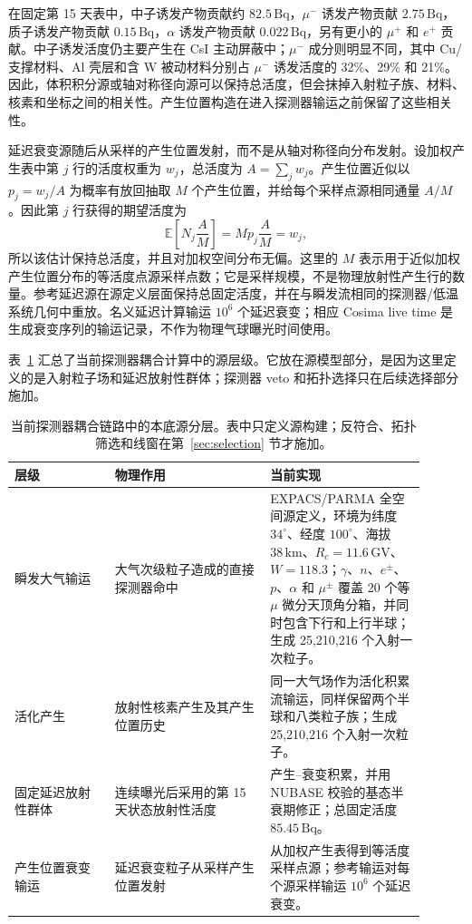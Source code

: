 \documentclass[preprint,12pt]{elsarticle}
\begin{document}
在固定第 15 天表中，中子诱发产物贡献约 $82.5\,\mathrm{Bq}$，$\mu^-$ 诱发产物贡献 $2.75\,\mathrm{Bq}$，质子诱发产物贡献 $0.15\,\mathrm{Bq}$，$\alpha$ 诱发产物贡献 $0.022\,\mathrm{Bq}$，另有更小的 $\mu^+$ 和 $e^+$ 贡献。中子诱发活度仍主要产生在 CsI 主动屏蔽中；$\mu^-$ 成分则明显不同，其中 Cu/支撑材料、Al 壳层和含 W 被动材料分别占 $\mu^-$ 诱发活度的 32\%、29\% 和 21\%。因此，体积积分源或轴对称径向源可以保持总活度，但会抹掉入射粒子族、材料、核素和坐标之间的相关性。产生位置构造在进入探测器输运之前保留了这些相关性。

延迟衰变源随后从采样的产生位置发射，而不是从轴对称径向分布发射。设加权产生表中第 $j$ 行的活度权重为 $w_j$，总活度为 $A=\sum_j w_j$。产生位置近似以 $p_j=w_j/A$ 为概率有放回抽取 $M$ 个产生位置，并给每个采样点源相同通量 $A/M$。因此第 $j$ 行获得的期望活度为
\begin{equation}
  \mathbb{E}\!\left[N_j\frac{A}{M}\right] = M p_j \frac{A}{M} = w_j ,
\end{equation}
所以该估计保持总活度，并且对加权空间分布无偏。这里的 $M$ 表示用于近似加权产生位置分布的等活度点源采样点数；它是采样规模，不是物理放射性产生行的数量。参考延迟源在源定义层面保持总固定活度，并在与瞬发流相同的探测器/低温系统几何中重放。名义延迟计算输运 $10^6$ 个延迟衰变；相应 Cosima live time 是生成衰变序列的输运记录，不作为物理气球曝光时间使用。

表~\ref{tab:background_source_model} 汇总了当前探测器耦合计算中的源层级。它放在源模型部分，是因为这里定义的是入射粒子场和延迟放射性群体；探测器 veto 和拓扑选择只在后续选择部分施加。

\begin{table}[t]
\centering
\caption{当前探测器耦合链路中的本底源分层。表中只定义源构建；反符合、拓扑筛选和线窗在第~\ref{sec:selection} 节才施加。}
\label{tab:background_source_model}
\begin{tabular}{p{0.22\linewidth}p{0.34\linewidth}p{0.34\linewidth}}
\hline
层级 & 物理作用 & 当前实现 \\
\hline
瞬发大气输运 & 大气次级粒子造成的直接探测器命中 & EXPACS/PARMA 全空间源定义，环境为纬度 $34^\circ$、经度 $100^\circ$、海拔 $38\,\mathrm{km}$、$R_c=11.6\,\mathrm{GV}$、$W=118.3$；$\gamma$、$n$、$e^\pm$、$p$、$\alpha$ 和 $\mu^\pm$ 覆盖 20 个等 $\mu$ 微分天顶角分箱，并同时包含下行和上行半球；生成 25,210,216 个入射一次粒子。 \\
活化产生 & 放射性核素产生及其产生位置历史 & 同一大气场作为活化积累流输运，同样保留两个半球和八类粒子族；生成 25,210,216 个入射一次粒子。 \\
固定延迟放射性群体 & 连续曝光后采用的第 15 天状态放射性活度 & 产生--衰变积累，并用 NUBASE 校验的基态半衰期修正；总固定活度 $85.45\,\mathrm{Bq}$。 \\
产生位置衰变输运 & 延迟衰变粒子从采样产生位置发射 & 从加权产生表得到等活度采样点源；参考输运对每个源采样输运 $10^6$ 个延迟衰变。 \\
\hline
\end{tabular}
\end{table}
\end{document}
